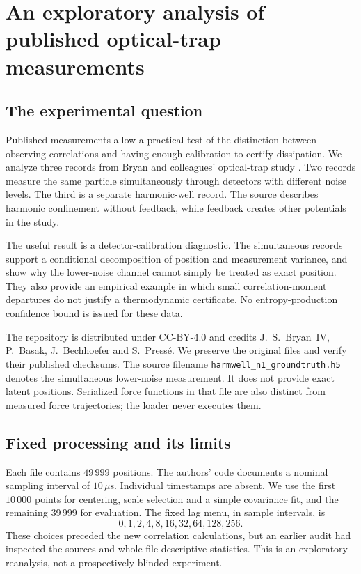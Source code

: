 \chapter[Published optical-trap measurements]{An exploratory analysis of published optical-trap measurements}
\label{ch:ci-empirical}

\section{The experimental question}

Published measurements allow a practical test of the distinction between
observing correlations and having enough calibration to certify dissipation.
We analyze three records from Bryan and colleagues' optical-trap study
\cite{ciBryan2022,ciBryanData2022}. Two records measure the same particle
simultaneously through detectors with different noise levels. The third is
a separate harmonic-well record. The source describes harmonic confinement
without feedback, while feedback creates other potentials in the study.

The useful result is a detector-calibration diagnostic. The simultaneous
records support a conditional decomposition of position and measurement
variance, and show why the lower-noise channel cannot simply be treated as
exact position. They also provide an empirical example in which small
correlation-moment departures do not justify a thermodynamic certificate.
No entropy-production confidence bound is issued for these data.

The repository is distributed under CC-BY-4.0 and credits J.~S.~Bryan~IV,
P.~Basak, J.~Bechhoefer and S.~Press\'e. We preserve the original files and
verify their published checksums. The source filename
\texttt{harmwell\_n1\_groundtruth.h5} denotes the simultaneous lower-noise
measurement. It does not provide exact latent positions. Serialized force
functions in that file are also distinct from measured force trajectories;
the loader never executes them.

\section{Fixed processing and its limits}

Each file contains $49\,999$ positions. The authors' code documents a nominal
sampling interval of $10\,\mu\mathrm{s}$. Individual timestamps are absent.
We use the first $10\,000$ points for centering, scale selection and a simple
covariance fit, and the remaining $39\,999$ for evaluation. The fixed lag menu,
in sample intervals, is
\[
  0,1,2,4,8,16,32,64,128,256.
\]
These choices preceded the new correlation calculations, but an earlier audit
had inspected the sources and whole-file descriptive statistics. This is an
exploratory reanalysis, not a prospectively blinded experiment.

